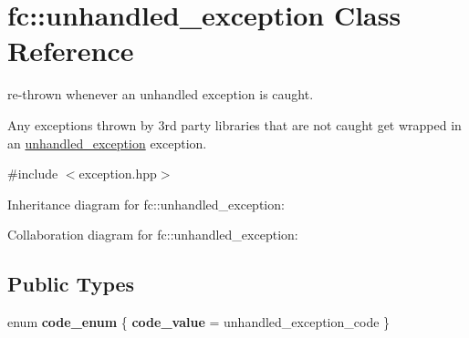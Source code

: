 \hypertarget{classfc_1_1unhandled__exception}{}\section{fc\+:\+:unhandled\+\_\+exception Class Reference}
\label{classfc_1_1unhandled__exception}


re-\/thrown whenever an unhandled exception is caught.

Any exceptions thrown by 3rd party libraries that are not caught get wrapped in an \mbox{\hyperlink{classfc_1_1unhandled__exception}{unhandled\+\_\+exception}} exception.  




{\ttfamily \#include $<$exception.\+hpp$>$}



Inheritance diagram for fc\+:\+:unhandled\+\_\+exception\+:


Collaboration diagram for fc\+:\+:unhandled\+\_\+exception\+:
\subsection*{Public Types}
\begin{DoxyCompactItemize}
\item 
\mbox{\label{classfc_1_1unhandled__exception_a9b059031419041311998822df4d27ac1}} 
enum {\bfseries code\+\_\+enum} \{ {\bfseries code\+\_\+value} = unhandled\+\_\+exception\+\_\+code
 \}
\end{DoxyCompactItemize}
